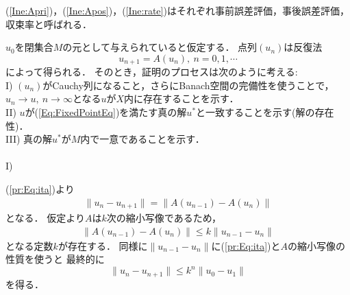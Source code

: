 \begin{Rem}
(\ref{Ine:Apri})，(\ref{Ine:Apos})，(\ref{Ine:rate})はそれぞれ事前誤差評価，事後誤差評価，収束率と呼ばれる．
\end{Rem}

\begin{Proof}[Banachの不動点定理]
$u_0$を閉集合$M$の元として与えられていると仮定する．
点列$(u_n)$は反復法
\begin{equation}
u_{n+1} = A(u_n), ~ n = 0,1,\cdots \label{pr:Eq:ita}
\end{equation}
によって得られる．
そのとき，証明のプロセスは次のように考える:\\
I) $(u_n)$がCauchy列になること，さらにBanach空間の完備性を使うことで，$u_n \rightarrow u, ~ n \rightarrow \infty$となる$u$が$X$内に存在することを示す．\\
II) $u$が(\ref{Eq:FixedPointEq})を満たす真の解$u^*$と一致することを示す(解の存在性)．\\
III) 真の解$u^*$が$M$内で一意であることを示す．\\
\\
I)

(\ref{pr:Eq:ita})より
\begin{align*}
\| u_n - u_{n+1} \| = \| A(u_{n-1}) - A(u_n) \|
\end{align*}
となる．
仮定より$A$は$k$次の縮小写像であるため，
\begin{align*}
\| A(u_{n-1}) - A(u_n) \| \le k \| u_{n-1} - u_n \|
\end{align*}
となる定数$k$が存在する．
同様に$\| u_{n-1} - u_n \|$に(\ref{pr:Eq:ita})と$A$の縮小写像の性質を使うと
最終的に
\begin{equation}
\| u_n - u_{n+1} \| \le k^n \| u_0 - u_1 \|
\label{prof:1}
\end{equation}
を得る．



\end{Proof}
